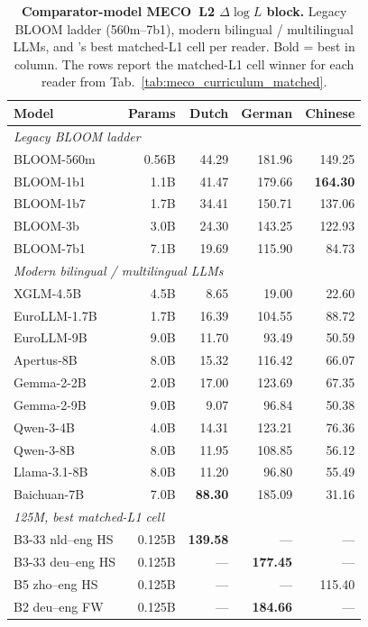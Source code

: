 \begin{table}[!ht]
  \centering
  \small
  \caption{\textbf{Comparator-model MECO~L2 $\Delta\log L$ block.} Legacy BLOOM ladder (560m--7b1), modern bilingual / multilingual LLMs, and \beetle{}'s best matched-L1 cell per reader. Bold = best in column. The \beetle{} rows report the matched-L1 cell winner for each reader from Tab.~\ref{tab:meco_curriculum_matched}.}
  \label{tab:meco_baseline_comparators}
  \begin{tabular}{lrrrr}
    \toprule
    Model & Params & Dutch & German & Chinese \\
    \midrule
    \multicolumn{5}{l}{\textit{Legacy BLOOM ladder}} \\
    BLOOM-560m            & 0.56B & 44.29 & 181.96 & 149.25 \\
    BLOOM-1b1             & 1.1B  & 41.47 & 179.66 & \textbf{164.30} \\
    BLOOM-1b7             & 1.7B  & 34.41 & 150.71 & 137.06 \\
    BLOOM-3b              & 3.0B  & 24.30 & 143.25 & 122.93 \\
    BLOOM-7b1             & 7.1B  & 19.69 & 115.90 & 84.73 \\
    \midrule
    \multicolumn{5}{l}{\textit{Modern bilingual / multilingual LLMs}} \\
    XGLM-4.5B             & 4.5B  & 8.65  & 19.00 & 22.60 \\
    EuroLLM-1.7B          & 1.7B  & 16.39 & 104.55 & 88.72 \\
    EuroLLM-9B            & 9.0B  & 11.70 & 93.49  & 50.59 \\
    Apertus-8B            & 8.0B  & 15.32 & 116.42 & 66.07 \\
    Gemma-2-2B            & 2.0B  & 17.00 & 123.69 & 67.35 \\
    Gemma-2-9B            & 9.0B  & 9.07  & 96.84  & 50.38 \\
    Qwen-3-4B             & 4.0B  & 14.31 & 123.21 & 76.36 \\
    Qwen-3-8B             & 8.0B  & 11.95 & 108.85 & 56.12 \\
    Llama-3.1-8B          & 8.0B  & 11.20 & 96.80  & 55.49 \\
    Baichuan-7B           & 7.0B  & \textbf{88.30} & 185.09 & 31.16 \\
    \midrule
    \multicolumn{5}{l}{\textit{\beetle{} 125M, best matched-L1 cell}} \\
    B3-33 nld--eng HS     & 0.125B & \textbf{139.58} & --- & --- \\
    B3-33 deu--eng HS     & 0.125B & --- & \textbf{177.45} & --- \\
    B5 zho--eng HS        & 0.125B & --- & --- & 115.40 \\
    B2 deu--eng FW        & 0.125B & --- & \textbf{184.66} & --- \\
    \bottomrule
  \end{tabular}
\end{table}

